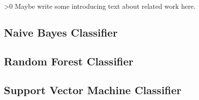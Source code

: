 \ifnum\printdraft>0
	Maybe write some introducing text about related work here.
\fi
\subsection{Naive Bayes Classifier}

\subsection{Random Forest Classifier}

\subsection{Support Vector Machine Classifier}

